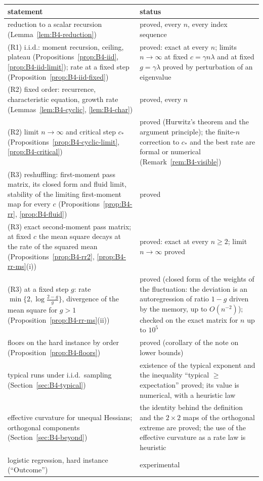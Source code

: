 \begin{center}
\footnotesize
\begin{tabular}{@{}p{4.1cm}p{11.6cm}@{}}
\toprule
statement & status \\
\midrule
reduction to a scalar recursion (Lemma~\ref{lem:B4-reduction}) & proved, every $n$, every index sequence \\
(R1) i.i.d.: moment recursion, ceiling, plateau (Propositions~\ref{prop:B4-iid}, \ref{prop:B4-iid-limit}); rate at a fixed step (Proposition~\ref{prop:B4-iid-fixed}) & proved: exact at every $n$; limits $n\to\infty$ at fixed $c=\gamma n\lambda$ and at fixed $g=\gamma\lambda$ proved by perturbation of an eigenvalue \\
(R2) fixed order: recurrence, characteristic equation, growth rate (Lemmas~\ref{lem:B4-cyclic}, \ref{lem:B4-char}) & proved, every $n$ \\
(R2) limit $n\to\infty$ and critical step $c_\ast$ (Propositions~\ref{prop:B4-cyclic-limit}, \ref{prop:B4-critical}) & proved (Hurwitz's theorem and the argument principle); the finite-$n$ correction to $c_\ast$ and the best rate are formal or numerical (Remark~\ref{rem:B4-visible}) \\
(R3) reshuffling: first-moment pass matrix, its closed form and fluid limit, stability of the limiting first-moment map for every $c$ (Propositions~\ref{prop:B4-rr}, \ref{prop:B4-fluid}) & proved \\
(R3) exact second-moment pass matrix; at fixed $c$ the mean square decays at the rate of the squared mean (Propositions~\ref{prop:B4-rr2}, \ref{prop:B4-rr-ms}(i)) & proved: exact at every $n\ge2$; limit $n\to\infty$ proved \\
(R3) at a fixed step $g$: rate $\min\{2,\log\frac{2-g}g\}$, divergence of the mean square for $g>1$ (Proposition~\ref{prop:B4-rr-ms}(ii)) & proved (closed form of the weights of the fluctuation: the deviation is an autoregression of ratio $1-g$ driven by the memory, up to $O(n^{-2})$); checked on the exact matrix for $n$ up to $10^5$ \\
floors on the hard instance by order (Proposition~\ref{prop:B4-floors}) & proved (corollary of the note on lower bounds) \\
typical runs under i.i.d.\ sampling (Section~\ref{sec:B4-typical}) & existence of the typical exponent and the inequality ``typical $\ge$ expectation'' proved; its value is numerical, with a heuristic law \\
effective curvature for unequal Hessians; orthogonal components (Section~\ref{sec:B4-beyond}) & the identity behind the definition and the $2\times2$ maps of the orthogonal extreme are proved; the use of the effective curvature as a rate law is heuristic \\
logistic regression, hard instance (``Outcome'') & experimental \\
\bottomrule
\end{tabular}
\end{center}

